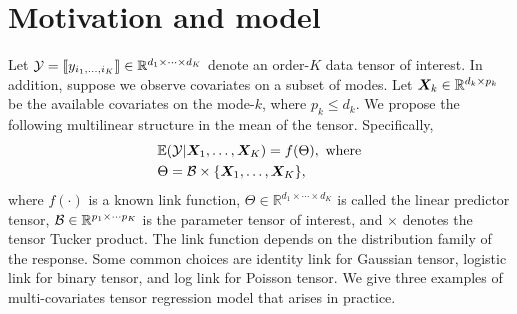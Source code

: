 \documentclass[twoside]{article}
\theoremstyle{plain}
\theoremstyle{definition}
\begin{document}
\section{Motivation and model}
Let $\mathcal{Y}=\llbracket y_{i_1,\ldots,i_K} \rrbracket\in\mathbb{R}^{d_1\times \cdots\times d_K}$ denote an order-$K$ data tensor of interest. In addition, suppose we observe covariates on a subset of modes. Let $\bm X_k\in\mathbb{R}^{d_k\times p_k}$ be the available covariates on the mode-$k$, where $p_k\leq d_k$. We propose the following multilinear structure in the mean of the tensor. Specifically, 
\begin{align}\label{eq:tensormodel}
&\mathbb{E}(\mathcal{Y}|\bm X_1,\ldots,\bm X_K)=f(\Theta),\ \text{where}\\
&\Theta =\mathcal{B}\times\{\bm X_1,\ldots,\bm X_K\} ,
\end{align}
where $f(\cdot)$ is a known link function, $\Theta\in\mathbb{R}^{d_1\times \cdots\times d_K}$ is called the linear predictor tensor, $\mathcal{B}\in\mathbb{R}^{p_1\times \cdots p_K}$ is the parameter tensor of interest, and $\times$ denotes the tensor Tucker product. The link function depends on the distribution family of the response. Some common choices are identity link for Gaussian tensor, logistic link for binary tensor, and log link for Poisson tensor. We give three examples of multi-covariates tensor regression model that arises in practice. 
\end{document}
